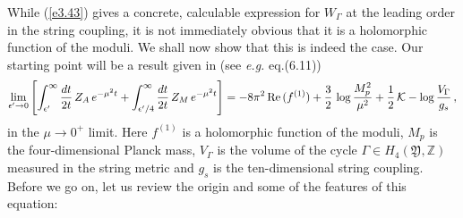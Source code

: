 \documentclass[12pt,a4paper]{article}
\newcommand{\be}{\begin{equation}}
\newcommand{\ee}{\end{equation}}
\newcommand{\refb}[1]{(\ref{#1})}
\newcommand{\IZ}{\mathds{Z}}
\def\Re{\,{\rm Re}\,}
\def\[{\left[}
\def\]{\right]}
\newcommand{\eps}{\epsilon}
\newcommand{\cK}{\mathcal{K}}
\def\CY{\mathfrak{Y}}
\begin{document}
While \refb{e3.43} gives a concrete, calculable expression for $W_\Gamma$ at the leading
order in the string coupling, it is
not immediately obvious that it is a holomorphic function of the moduli. We shall now
show that this is indeed the case. Our starting point will be a result given in
\cite{Akerblom:2007uc} (see {\it e.g.} eq.(6.11))
\be\label{e3n.44}
\lim_{\eps'\to 0}\[\int_{\eps'}^{\infty} {dt\over 2t} \,  Z_A \, e^{-\mu^2 t} + \int_{\eps'/4}^{\infty} {dt\over 2t} \,  Z_M
\, e^{-\mu^2 t} \]
= -8\pi^2 \Re(f^{(1)}) +{3\over 2}\, \log{M_p^2\over \mu^2} +{1\over 2}\, \cK
-\log {V_\Gamma\over g_s}\, ,
\ee
in the $\mu\to 0^+$ limit.  Here $f^{(1)}$ is a holomorphic function of the moduli, $M_p$ is
the four-dimensional Planck mass, $V_\Gamma$ is the volume of the cycle $\Gamma\in H_4(\CY,\IZ)$
measured in the string metric and $g_s$ is the ten-dimensional string coupling.
Before we go on, let us review the origin and some of the features of this equation:
\end{document}
